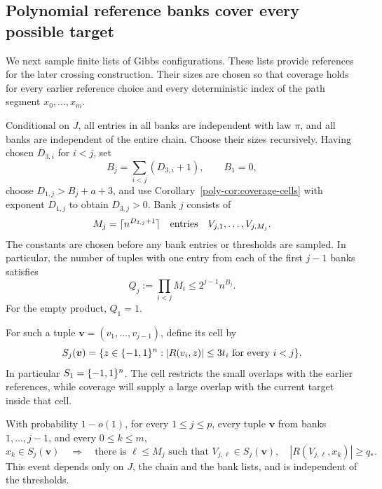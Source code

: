 \subsection{Polynomial reference banks cover every possible target}
\label{fixed-subsec:banks}

We next sample finite lists of Gibbs configurations. These lists provide
references for the later crossing construction. Their sizes are chosen
so that coverage holds for every earlier reference choice and every
deterministic index of the path segment $x_0,\ldots,x_m$.

Conditional on $J$, all entries in all banks are independent with law
$\pi$, and all banks are independent of the entire chain. Choose their
sizes recursively. Having chosen $D_{3,i}$ for $i<j$, set
\[
 B_j=\sum_{i<j}(D_{3,i}+1),\qquad B_1=0,
\]
choose $D_{1,j}>B_j+a+3$, and use
Corollary~\ref{poly-cor:coverage-cells} with exponent $D_{1,j}$ to obtain
$D_{3,j}>0$. Bank $j$ consists of
\begin{equation}\label{fixed-eq:bank-sizes}
 M_j=\lceil n^{D_{3,j}+1}\rceil
 \quad\hbox{entries}\quad V_{j,1},\ldots,V_{j,M_j}.
\end{equation}
The constants are chosen before any bank entries or thresholds are
sampled. In particular, the number of tuples with one entry from each
of the first $j-1$ banks satisfies
\begin{equation}\label{fixed-eq:tuple-count}
 Q_j:=\prod_{i<j}M_i\le2^{j-1}n^{B_j}.
\end{equation}
For the empty product, $Q_1=1$.

For such a tuple $\boldsymbol v=(v_1,\ldots,v_{j-1})$, define its cell by
\begin{equation}\label{fixed-eq:cell}
 S_j(\boldsymbol v)
 =\{z\in\{-1,1\}^n: |R(v_i,z)|\le3t_i\text{ for every }i<j\}.
\end{equation}
In particular $S_1=\{-1,1\}^n$. The cell restricts the small overlaps with
the earlier references, while coverage will supply a large overlap
with the current target inside that cell.

\begin{lemma}
\label{fixed-lem:bank-coverage}
With probability $1-o(1)$, for every $1\le j\le p$, every tuple
$\boldsymbol v$ from banks $1,\ldots,j-1$, and every $0\le k\le m$,
\[
 x_k\in S_j(\boldsymbol v)
 \quad\Longrightarrow\quad
 \text{there is }\ell\le M_j\text{ such that }
 V_{j,\ell}\in S_j(\boldsymbol v),\quad
 |R(V_{j,\ell},x_k)|\ge q_*.
\]
This event depends only on $J$, the chain and the bank lists, and is
independent of the thresholds.
\end{lemma}

